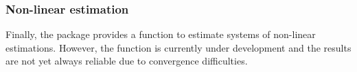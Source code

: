 \subsubsection*{Non-linear estimation}
Finally, the  package provides a function to estimate
systems of non-linear estimations.
However, the function  is currently under
development and the results are not yet always reliable due to
convergence difficulties.




